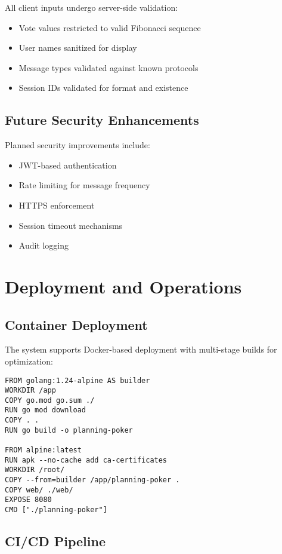 \documentclass[11pt,a4paper]{article}
\begin{document}
All client inputs undergo server-side validation:

\begin{itemize}
    \item Vote values restricted to valid Fibonacci sequence
    \item User names sanitized for display
    \item Message types validated against known protocols
    \item Session IDs validated for format and existence
\end{itemize}

\subsection{Future Security Enhancements}

Planned security improvements include:

\begin{itemize}
    \item JWT-based authentication
    \item Rate limiting for message frequency
    \item HTTPS enforcement
    \item Session timeout mechanisms
    \item Audit logging
\end{itemize}

\section{Deployment and Operations}

\subsection{Container Deployment}

The system supports Docker-based deployment with multi-stage builds for optimization:

\begin{lstlisting}[caption=Docker Configuration]
FROM golang:1.24-alpine AS builder
WORKDIR /app
COPY go.mod go.sum ./
RUN go mod download
COPY . .
RUN go build -o planning-poker

FROM alpine:latest
RUN apk --no-cache add ca-certificates
WORKDIR /root/
COPY --from=builder /app/planning-poker .
COPY web/ ./web/
EXPOSE 8080
CMD ["./planning-poker"]
\end{lstlisting}

\subsection{CI/CD Pipeline}
\end{document}
